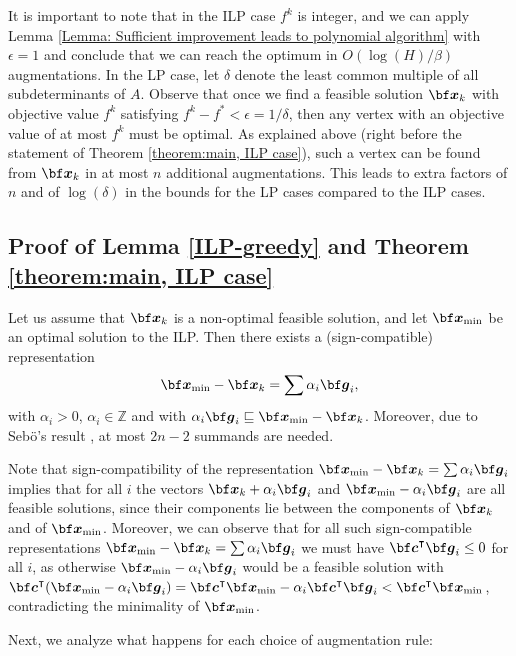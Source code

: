 \documentclass[moor]{informs1hack}              %
\newcommand{\Z}{{\mathbb Z}}
\def\ve#1{\mathchoice{\mbox{\boldmath$\displaystyle\bf#1$}}
{\mbox{\boldmath$\textstyle\bf#1$}}
{\mbox{\boldmath$\scriptstyle\bf#1$}}
{\mbox{\boldmath$\scriptscriptstyle\bf#1$}}}
\newcommand\vecc{{\ve c}}
\newcommand\veg{{\ve g}}
\newcommand\vex{{\ve x}}
\newcommand{\red}{\sqsubseteq}
\newcommand{\T}{{\intercal}} %
\begin{document}
It is important to note that in the ILP case $f^k$ is integer, and we can apply Lemma \ref{Lemma: Sufficient improvement leads to polynomial algorithm} with $\epsilon=1$ and conclude that we can reach the optimum in $O(\log{(H)}/\beta)$ augmentations. In the LP case, let $\delta$ denote the least common multiple of all subdeterminants of $A$. Observe that once we find a feasible solution $\vex_k$ with objective value $f^k$ satisfying $f^k-f^*<\epsilon=1/\delta$, then any vertex with an objective value of at most $f^k$ must be optimal. As explained above (right before the statement of Theorem \ref{theorem:main, ILP case}), such a vertex can be found from $\vex_k$ in at most $n$ additional augmentations. This leads to extra factors of $n$ and of $\log(\delta)$ in the bounds for the LP cases compared to the ILP cases.


\subsection{Proof of Lemma \ref{ILP-greedy} and Theorem \ref{theorem:main, ILP case}}

Let us assume that $\vex_k$ is a non-optimal feasible solution, and let $\vex_{\min}$ be an optimal solution to the ILP. Then there exists a (sign-compatible) representation
\[
  \vex_{\min} -  \vex_k =\sum\alpha_i\veg_i,
\]
with $\alpha_i>0$, $\alpha_i\in\Z$ and with $\alpha_i\veg_i\red \vex_{\min} - \vex_k$. Moreover, due to Seb\"o's result \cite{Sebo90}, at most $2n-2$ summands are needed.

Note that sign-compatibility of the representation $\vex_{\min}-\vex_k =\sum\alpha_i\veg_i$ implies that for all $i$ the vectors $\vex_{k}+\alpha_i\veg_i$ and $\vex_{\min}-\alpha_i\veg_i$ are all feasible solutions, since their components lie between the components of $\vex_k$ and of $\vex_{\min}$. Moreover, we can observe that for all such sign-compatible representations $\vex_{\min}-\vex_k =\sum\alpha_i\veg_i$ we must have $\vecc^\T\veg_i\leq 0$ for all $i$, as otherwise $\vex_{\min}-\alpha_i\veg_i$ would be a feasible solution with $\vecc^\T (\vex_{\min}-\alpha_i\veg_i)=\vecc^\T\vex_{\min}-\alpha_i\vecc^\T\veg_i<\vecc^\T\vex_{\min}$, contradicting the minimality of $\vex_{\min}$.

Next, we analyze what happens for each choice of augmentation rule:
\end{document}
